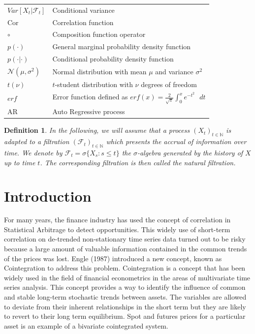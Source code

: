 \documentclass[11pt,a4,twosided,singlespacing,titlepagenumber=on]{scrreprt}
\numberwithin{equation}{chapter} %
\newtheorem{definition}[theorem]{Definition}%
\theoremstyle{remark}
\begin{document}
\begin{table}[h]
\begin{tabular}{ll}
$Var[X_t | \mathcal{F}_t]$			& Conditional variance \\
Cor									& Correlation function \\
$\circ$								& Composition function operator \\
$p(\cdot)$							& General marginal probability density function \\
$p(\cdot| \cdot)$					& Conditional probability density function \\
$\mathcal{N}(\mu, \sigma^2)$		& Normal distribution with mean $\mu$ and variance $\sigma^2$ \\
$t(\nu)$							& $t$-student distribution with $\nu$ degrees of freedom \\
$erf$								& Error function defined as $erf(x) = \frac{2}{\sqrt{\pi}} \int_0^x e^{-t^2}\text{ }dt$ \\
AR									& Auto Regressive process \\
\hline
\end{tabular}
\end{table}
\noindent
\begin{definition}
In the following, we will assume that a process $(X_t)_{t \in \mathbb{N}}$ is adapted to a filtration $(\mathcal{F}_t)_{t \in \mathbb{N}}$ which presents the accrual of information over time. We denote by $\mathcal{F}_t = \sigma \{X_s : s \leq t \}$ the $\sigma$-algebra generated by the history of $X$ up to time $t$. The corresponding filtration is then called the natural filtration.
\end{definition}

\chapter{Introduction}

For many years, the finance industry has used the concept of correlation in Statistical Arbitrage to detect opportunities. This widely use of short-term correlation on de-trended non-stationary time series data turned out to be risky because a large amount of valuable information contained in the common trends of the prices was lost. Engle (1987) introduced a new concept, known as Cointegration to address this problem. Cointegration is a concept that has been widely used in the field of financial econometrics in the areas of multivariate time series analysis. This concept provides a way to identify the influence of common and stable long-term stochastic trends between assets. The variables are allowed to deviate from their inherent relationships in the short term but they are likely to revert to their long term equilibrium. Spot and futures prices for a particular asset is an example of a bivariate cointegrated system. \\
\end{document}
